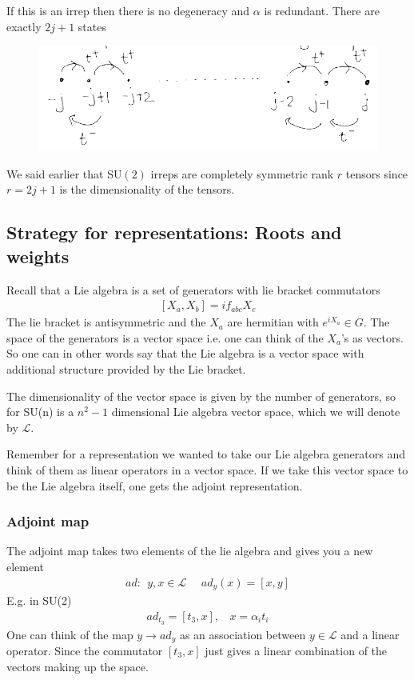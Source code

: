 \documentclass[a4paper,12pt]{article}
\begin{document}
If this is an irrep then there is no degeneracy and $\alpha$ is redundant. There are exactly $2j+1$ states
\begin{figure}[H]
	\centering
	\includegraphics[width=0.6\linewidth]{24}
	\caption{}
	\label{fig:4}
\end{figure}
We said earlier that SU$(2)$ irreps are completely symmetric rank $r$ tensors since $r=2j+1$ is the dimensionality of the tensors.
\subsection{Strategy for representations: Roots and weights}
Recall that a Lie algebra is a set of generators with lie bracket commutators
\begin{equation}
	\begin{aligned}
		\left[X_a,X_b\right]=if_{abc}X_c
	\end{aligned}
\end{equation}
The lie bracket is antisymmetric and the $X_a$ are hermitian with $e^{iX_a}\in G$. The space of the generators is a vector space i.e. one can think of the $X_a$'s as vectors. So one can in other words say that the Lie algebra is a vector space with additional structure provided by the Lie bracket.

The dimensionality of the vector space is given by the number of generators, so for SU(n) is a $n^2-1$ dimensional Lie algebra vector space, which we will denote by $\mathcal{L}$.

Remember for a representation we wanted to take our Lie algebra generators and think of them as linear operators in a vector space. If we take this vector space to be the Lie algebra itself, one gets the adjoint representation.
\subsubsection{Adjoint map}
The adjoint map takes two elements of the lie algebra and gives you a new element
\begin{equation}
	\begin{aligned}
		ad:~~y,x\in \mathcal{L}~~~~~~ad_y(x)=[x,y]
	\end{aligned}
\end{equation}
E.g. in SU(2)
\begin{equation}
	\begin{aligned}
		ad_{t_3}=[t_3,x], ~~~~x=\alpha_i t_i
	\end{aligned}
\end{equation}
One can think of the map $y\to ad_y$ as an association between $y\in \mathcal{L}$ and a linear operator. Since the commutator $[t_3,x]$ just gives a linear combination of the vectors making up the space.
\end{document}
